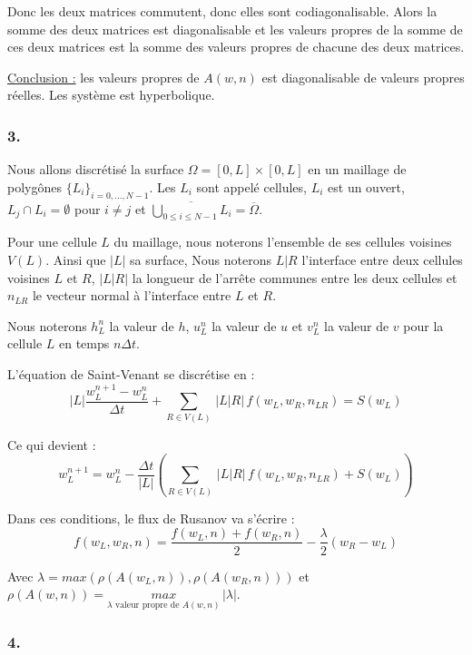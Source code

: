 \documentclass{article}
\begin{document}
Donc les deux matrices commutent, donc elles sont codiagonalisable. Alors la somme des deux matrices est diagonalisable et les valeurs propres de la somme de ces deux matrices est la somme des 
valeurs propres de chacune des deux matrices.

\underline{Conclusion :} les valeurs propres de $A(w,n)$ est diagonalisable de valeurs propres réelles. Les système est hyperbolique. 

\subsubsection*{3.}

Nous allons discrétisé la surface $\Omega = [0,L] \times [0,L]$ en un maillage de polygônes $\{L_i\}_{i=0,...,N-1}$. Les $L_i$ sont appelé
cellules, $L_i$ est un ouvert, $L_j \cap L_i = \emptyset$ pour $i \ne j$ et $\overline{\underset{0 \leq i \leq N-1}{\bigcup} L_i} = \overline{\Omega}$.

Pour une cellule $L$ du maillage, nous noterons l'ensemble de ses cellules voisines $V(L)$. Ainsi que $|L|$ sa surface, 
Nous noterons $L|R$ l'interface entre deux cellules voisines $L$ et $R$, $\left| L|R \right|$ la longueur de l'arrête communes entre les deux cellules 
et $n_{LR}$ le vecteur normal à l'interface entre $L$ et $R$.
\newline

Nous noterons $h_L^n$ la valeur de $h$, $u_L^n$ la valeur de $u$ et $v_L^n$ la valeur de $v$ pour la cellule $L$ en temps $n \Delta t$.
\newline

L'équation de Saint-Venant se discrétise en :
\[ |L| \frac{w_L^{n+1} - w_L^n}{\Delta t} + \underset{R \in V(L)}{\sum} \, \left| L|R \right| \, f(w_L, w_R, n_{LR}) = S(w_L) \]

Ce qui devient :
\[ w_L^{n+1} = w_L^n - \frac{\Delta t}{|L|} \left( \underset{R \in V(L)}{\sum} \, \left| L|R \right| \, f(w_L, w_R, n_{LR}) + S(w_L) \right) \]

Dans ces conditions, le flux de Rusanov va s'écrire :
\[ f(w_L, w_R, n) = \frac{f(w_L,n)+f(w_R,n)}{2} - \frac{\lambda}{2} (w_R-w_L) \]

Avec $\lambda = max (\rho(A(w_L,n)), \rho(A(w_R,n)))$ et $\rho(A(w,n)) = \underset{\lambda \text{ valeur propre de } A(w,n)}{max} \, |\lambda|$.

\subsubsection*{4.}
\end{document}
